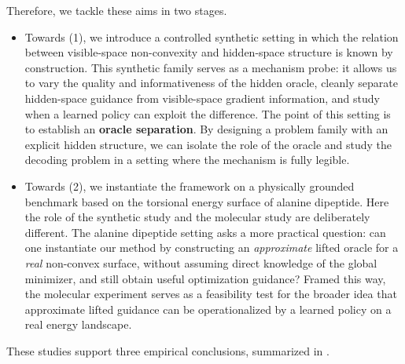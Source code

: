 \documentclass[10pt]{article}
\theoremstyle{definition}
\begin{document}
Therefore, we tackle these aims in two stages.
\begin{itemize}
    \item Towards (1), we introduce a controlled synthetic setting in which the relation between visible-space non-convexity and hidden-space structure is known by construction. This synthetic family serves as a mechanism probe: it allows us to vary the quality and informativeness of the hidden oracle, cleanly separate hidden-space guidance from visible-space gradient information, and study when a learned policy can exploit the difference. The point of this setting is to establish an \textbf{oracle separation}. By designing a problem family with an explicit hidden structure, we can isolate the role of the oracle and study the decoding problem in a setting where the mechanism is fully legible.
    \item Towards (2), we instantiate the framework on a physically grounded benchmark based on the torsional energy surface of alanine dipeptide. Here the role of the synthetic study and the molecular study are deliberately different. The alanine dipeptide setting asks a more practical question: can one instantiate our method by constructing an \textit{approximate} lifted oracle for a \textit{real} non-convex surface, without assuming direct knowledge of the global minimizer, and still obtain useful optimization guidance? Framed this way, the molecular experiment serves as a feasibility test for the broader idea that approximate lifted guidance can be operationalized by a learned policy on a real energy landscape.
\end{itemize}
These studies support three empirical conclusions, summarized in .
\end{document}
